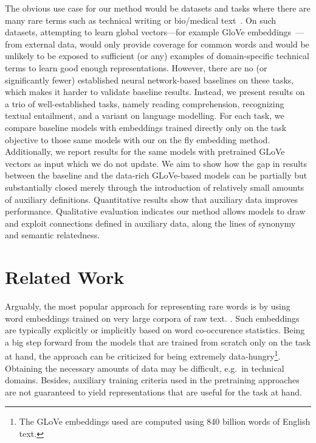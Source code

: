 The obvious use case for our method would be datasets and tasks where there are many rare terms %
such as technical writing or bio/medical text~\citep{deleger2016overview}. On such datasets, attempting to learn global vectors---for example GloVe embeddings~\citep{pennington2014glove}---from external data, would only provide coverage for common words and would be unlikely to be exposed to sufficient (or any) examples of domain-specific technical terms to learn good enough representations. However, there are no (or significantly fewer) established neural network-based baselines on these tasks, which makes it harder to validate baseline results. Instead, we present results on a trio of well-established tasks, namely reading comprehension, 
recognizing textual entailment, and a variant on language modelling. For each task, we compare baseline models with embeddings trained directly only on the task objective to those same models with our on the fly embedding method. Additionally, we report results for the same models with pretrained GLoVe vectors as input which we do not update. We aim to show how the gap in results between the baseline and the data-rich GLoVe-based models can be partially but substantially closed merely through the introduction of relatively small amounts of auxiliary definitions. Quantitative results show that auxiliary data improves performance. Qualitative evaluation indicates our method allows models to draw and exploit connections defined in auxiliary data, along the lines of synonymy and semantic relatedness. 

\section{Related Work}
\label{sec:related}

Arguably, the most popular approach for representing rare words is by using word embeddings trained on very large corpora of raw text.
\citep{mikolov2013distributed,pennington2014glove}. Such embeddings are typically explicitly or implicitly based on word co-occurence statistics. Being a big step forward from the models that are trained from scratch only on the task at hand, the approach can be criticized for being extremely data-hungry\footnote{The GLoVe embeddings used are computed using 840 billion words of English text.}. Obtaining the necessary amounts of data may be difficult, e.g.~in technical domains. Besides, auxiliary training criteria used in the pretraining approaches are not guaranteed to yield representations that are useful for the task at hand.

